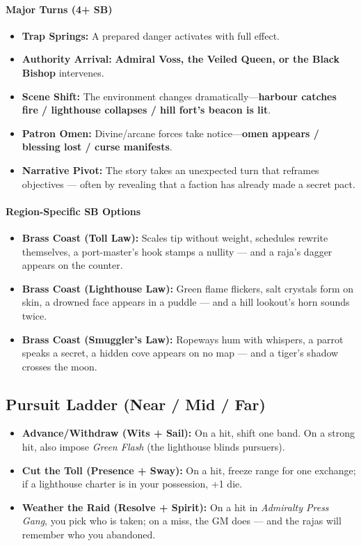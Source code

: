 \paragraph{Major Turns (4+ SB)}
\begin{itemize}
\item \textbf{Trap Springs:} A prepared danger activates with full effect.
\item \textbf{Authority Arrival:} \textbf{Admiral Voss, the Veiled Queen, or the Black Bishop} intervenes.
\item \textbf{Scene Shift:} The environment changes dramatically---\textbf{harbour catches fire / lighthouse collapses / hill fort's beacon is lit}.
\item \textbf{Patron Omen:} Divine/arcane forces take notice---\textbf{omen appears / blessing lost / curse manifests}.
\item \textbf{Narrative Pivot:} The story takes an unexpected turn that reframes objectives --- often by revealing that a faction has already made a secret pact.
\end{itemize}

\paragraph{Region-Specific SB Options}
\begin{itemize}
\item \textbf{Brass Coast (Toll Law):} Scales tip without weight, schedules rewrite themselves, a port-master's hook stamps a nullity --- and a raja's dagger appears on the counter.
\item \textbf{Brass Coast (Lighthouse Law):} Green flame flickers, salt crystals form on skin, a drowned face appears in a puddle --- and a hill lookout's horn sounds twice.
\item \textbf{Brass Coast (Smuggler's Law):} Ropeways hum with whispers, a parrot speaks a secret, a hidden cove appears on no map --- and a tiger's shadow crosses the moon.
\end{itemize}

\subsection*{Pursuit Ladder (Near / Mid / Far)}
\begin{itemize}
\item \textbf{Advance/Withdraw (Wits + Sail):} On a hit, shift one band. On a strong hit, also impose \emph{Green Flash} (the lighthouse blinds pursuers).
\item \textbf{Cut the Toll (Presence + Sway):} On a hit, freeze range for one exchange; if a lighthouse charter is in your possession, +1 die.
\item \textbf{Weather the Raid (Resolve + Spirit):} On a hit in \emph{Admiralty Press Gang}, you pick who is taken; on a miss, the GM does --- and the rajas will remember who you abandoned.
\end{itemize}

